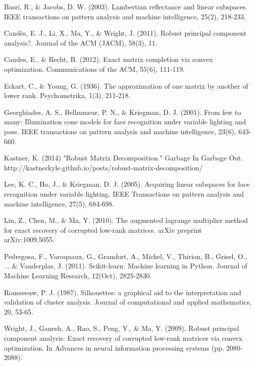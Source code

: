 \documentclass[11pt]{scrartcl} %
\theoremstyle{plain}
\begin{document}
\begin{thebibliography}{9}

 Basri, R., \& Jacobs, D. W. (2003). Lambertian reflectance and linear subspaces. IEEE transactions on pattern analysis and machine intelligence, 25(2), 218-233.

 Candès, E. J., Li, X., Ma, Y., \& Wright, J. (2011). Robust principal component analysis?. Journal of the ACM (JACM), 58(3), 11.

 Candes, E., \& Recht, B. (2012). Exact matrix completion via convex optimization. Communications of the ACM, 55(6), 111-119.

 Eckart, C., \& Young, G. (1936). The approximation of one matrix by another of lower rank. Psychometrika, 1(3), 211-218.

 Georghiades, A. S., Belhumeur, P. N., \& Kriegman, D. J. (2001). From few to many: Illumination cone models for face recognition under variable lighting and pose. IEEE transactions on pattern analysis and machine intelligence, 23(6), 643-660.

 Kastner, K. (2014) "Robust Matrix Decomposition." Garbage In Garbage Out. http://kastnerkyle.github.io/posts/robust-matrix-decomposition/

 Lee, K. C., Ho, J., \& Kriegman, D. J. (2005). Acquiring linear subspaces for face recognition under variable lighting. IEEE Transactions on pattern analysis and machine intelligence, 27(5), 684-698.

 Lin, Z., Chen, M., \& Ma, Y. (2010). The augmented lagrange multiplier method for exact recovery of corrupted low-rank matrices. arXiv preprint arXiv:1009.5055.

 Pedregosa, F., Varoquaux, G., Gramfort, A., Michel, V., Thirion, B., Grisel, O., ... \& Vanderplas, J. (2011). Scikit-learn: Machine learning in Python. Journal of Machine Learning Research, 12(Oct), 2825-2830.

 Rousseeuw, P. J. (1987). Silhouettes: a graphical aid to the interpretation and validation of cluster analysis. Journal of computational and applied mathematics, 20, 53-65.

 Wright, J., Ganesh, A., Rao, S., Peng, Y., \& Ma, Y. (2009). Robust principal component analysis: Exact recovery of corrupted low-rank matrices via convex optimization. In Advances in neural information processing systems (pp. 2080-2088).

\end{thebibliography}
\end{document}
